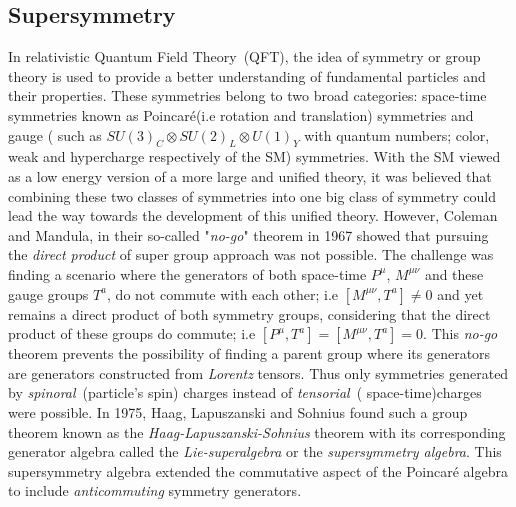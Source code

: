 \subsection{Supersymmetry}
In relativistic Quantum Field Theory~(QFT), the idea of symmetry or group theory is used to provide a better understanding of fundamental particles and their properties. These symmetries belong to two broad categories: space-time symmetries known as Poincar\'{e}(i.e rotation and translation) symmetries and gauge ( such as $SU(3)_{C}\otimes SU(2)_{L}\otimes U(1)_{Y}$ with quantum numbers; color, weak and hypercharge respectively of the SM) symmetries. With the SM viewed as a low energy version of a more large and unified theory,  
it was believed that combining these two classes of symmetries into one big class of symmetry could lead the way towards the development of this unified theory. However, Coleman and Mandula\cite{SUSY}, in their so-called "\textit{no-go}" theorem in 1967  showed that pursuing the \textit{direct product} of super group approach  was not possible. %
The challenge was finding a scenario where the generators of both space-time $P^{\mu}$, $M^{\mu\nu} $  and these gauge groups $T^{a}$, do not commute with each other; i.e $ \left[M^{\mu\nu}, T^{a}\right] \neq 0$ and yet remains a direct product of both symmetry groups, considering that the direct product of these groups do commute; i.e
$ \left[P^{\mu}, T^{a}\right] = \left[M^{\mu\nu}, T^{a}\right] = 0$. 
\newline
This \textit{no-go} theorem prevents the possibility of finding a parent group where its generators are generators constructed from \textit{Lorentz} tensors. Thus only symmetries  generated by \textit{spinoral}~(particle's spin) charges instead of \textit{tensorial}~( space-time)charges were possible. In 1975, Haag, Lapuszanski and Sohnius \cite{MSUSY} found such a group theorem known as the \textit{Haag-Lapuszanski-Sohnius} theorem with its corresponding generator algebra called the \textit{Lie-superalgebra} or the \textit{supersymmetry algebra}.  This supersymmetry algebra extended the commutative aspect of the Poincar\'{e} algebra to include \textit{anticommuting} symmetry generators.
